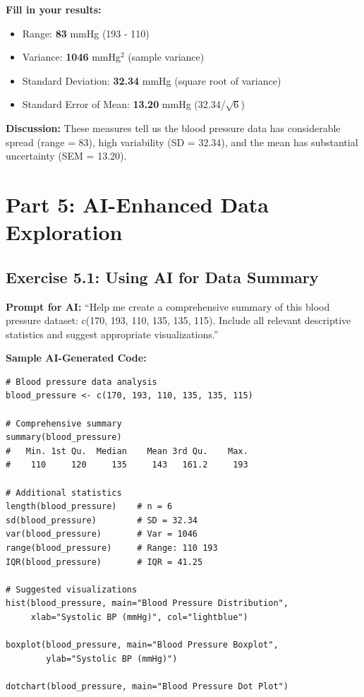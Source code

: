 \documentclass[11pt]{article}
\begin{document}
\textbf{Fill in your results:}
\begin{itemize}
\item Range: \textcolor{answergreen}{\textbf{83}} mmHg \textcolor{answergreen}{(193 - 110)}
\item Variance: \textcolor{answergreen}{\textbf{1046}} mmHg$^2$ \textcolor{answergreen}{(sample variance)}
\item Standard Deviation: \textcolor{answergreen}{\textbf{32.34}} mmHg \textcolor{answergreen}{(square root of variance)}
\item Standard Error of Mean: \textcolor{answergreen}{\textbf{13.20}} mmHg \textcolor{answergreen}{(32.34/$\sqrt{6}$)}
\end{itemize}

\textcolor{answergreen}{\textbf{Discussion:}} These measures tell us the blood pressure data has considerable spread (range = 83), high variability (SD = 32.34), and the mean has substantial uncertainty (SEM = 13.20).

\newpage
\section{Part 5: AI-Enhanced Data Exploration}

\subsection{Exercise 5.1: Using AI for Data Summary}
\begin{tcolorbox}[colback=aiblue!10,colframe=aiblue,boxrule=1pt,arc=2pt,left=6pt,right=6pt,top=6pt,bottom=6pt]
\textbf{\textcolor{aiblue}{Prompt for AI:}} ``Help me create a comprehensive summary of this blood pressure dataset: c(170, 193, 110, 135, 135, 115). Include all relevant descriptive statistics and suggest appropriate visualizations.''
\end{tcolorbox}

\textbf{Sample AI-Generated Code:}
\begin{lstlisting}
# Blood pressure data analysis
blood_pressure <- c(170, 193, 110, 135, 135, 115)

# Comprehensive summary
summary(blood_pressure)
#   Min. 1st Qu.  Median    Mean 3rd Qu.    Max.
#    110     120     135     143   161.2     193

# Additional statistics
length(blood_pressure)    # n = 6
sd(blood_pressure)        # SD = 32.34
var(blood_pressure)       # Var = 1046
range(blood_pressure)     # Range: 110 193
IQR(blood_pressure)       # IQR = 41.25

# Suggested visualizations
hist(blood_pressure, main="Blood Pressure Distribution",
     xlab="Systolic BP (mmHg)", col="lightblue")

boxplot(blood_pressure, main="Blood Pressure Boxplot",
        ylab="Systolic BP (mmHg)")

dotchart(blood_pressure, main="Blood Pressure Dot Plot")
\end{lstlisting}
\end{document}
